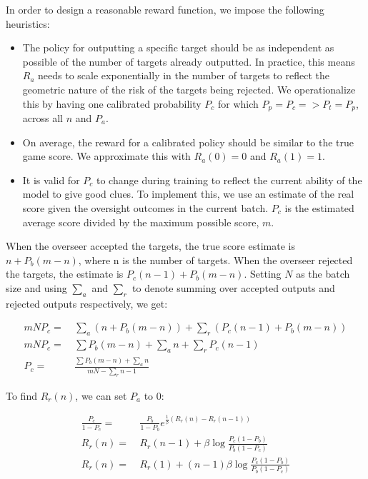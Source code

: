 \documentclass{article}
\begin{document}
In order to design a reasonable reward function, we impose the following heuristics:
\begin{itemize}
  \item The policy for outputting a specific target should be as independent as possible of the number of targets already outputted. In practice, this means $R_a$ needs to scale exponentially in the number of targets to reflect the geometric nature of the risk of the targets being rejected. We operationalize this by having one calibrated probability $P_c$ for which $P_p = P_c => P_t = P_p$, across all $n$ and $P_a$.
  \item On average, the reward for a calibrated policy should be similar to the true game score. We approximate this with $R_a(0) = 0$ and $R_a(1) = 1$.
  \item It is valid for $P_c$ to change during training to reflect the current ability of the model to give good clues. To implement this, we use an estimate of the real score given the oversight outcomes in the current batch. $P_c$ is the estimated average score divided by the maximum possible score, $m$.
\end{itemize}

\pagebreak



When the overseer accepted the targets, the true score estimate is $n + P_b(m - n)$, where n is the number of targets. When the overseer rejected the targets, the estimate is $P_c(n - 1) + P_b(m - n)$. Setting $N$ as the batch size and using $\sum_a$ and $\sum_r$ to denote summing over accepted outputs and rejected outputs respectively, we get:

\begin{align*}
  mNP_c = \: & \sum_a (n + P_b(m - n)) + \sum_r (P_c (n - 1) + P_b (m - n)) \\
  mNP_c = \: & \sum P_b(m - n) + \sum_a n + \sum_r P_c (n - 1)              \\
  P_c = \:   & \frac{\sum P_b(m - n) + \sum_a n}{m N - \sum_r n - 1}
\end{align*}

To find $R_r(n)$, we can set $P_a$ to $0$:

\begin{align*}
  \frac{P_c}{1 - P_c} = \: & \frac{P_b}{1 - P_b} e^{\frac{1}{\beta} \left(R_r(n) - R_r(n-1)\right)} \\
  R_r(n) = \:              & R_r(n-1) + \beta \log \frac{P_c (1 - P_b)}{P_b(1 - P_c)}               \\
  R_r(n) = \:              & R_r(1) + (n - 1) \beta \log \frac{P_c (1 - P_b)}{P_b(1 - P_c)}
\end{align*}
\end{document}
